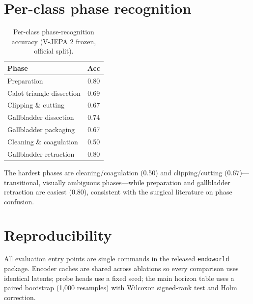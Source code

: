 \documentclass[final,3p,times,twocolumn]{elsarticle}
\begin{document}
\section{Per-class phase recognition}
\begin{table}[h]
\centering
\caption{Per-class phase-recognition accuracy (V-JEPA 2 frozen, official split).}
\label{tab:perclass}
\small
\begin{tabular}{lc}
\toprule
Phase & Acc \\
\midrule
Preparation & 0.80 \\
Calot triangle dissection & 0.69 \\
Clipping \& cutting & 0.67 \\
Gallbladder dissection & 0.74 \\
Gallbladder packaging & 0.67 \\
Cleaning \& coagulation & 0.50 \\
Gallbladder retraction & 0.80 \\
\bottomrule
\end{tabular}
\end{table}

The hardest phases are cleaning/coagulation (0.50) and clipping/cutting (0.67)---transitional, visually ambiguous phases---while preparation and gallbladder retraction are easiest (0.80), consistent with the surgical literature on phase confusion.

\section{Reproducibility}
All evaluation entry points are single commands in the released \texttt{endoworld} package. Encoder caches are shared across ablations so every comparison uses identical latents; probe heads use a fixed seed; the main horizon table uses a paired bootstrap (1,000 resamples) with Wilcoxon signed-rank test and Holm correction.



\end{document}
